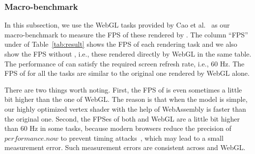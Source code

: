 


\subsubsection{Macro-benchmark}

In this subsection, we use the WebGL tasks provided by Cao et al.~\cite{ndss17cao} as our macro-benchmark to measure the FPS of these rendered by \sys.  The column ``FPS'' under \sys of Table~\ref{tab:result} shows the FPS of each rendering task and we also show the FPS without \sys, i.e., these rendered directly by WebGL in the same table.  The performance of \sys can satisfy the required screen refresh rate, i.e., 60 Hz. 
 The FPS of \sys for all the tasks are similar to the original one rendered by WebGL alone. 
 
 There are two things worth noting.  First, the FPS of \sys is even sometimes a little bit higher than the one of WebGL.  The reason is that when the model is simple, our highly optimized vertex shader with the help of WebAssembly is faster than the original one.  Second, the FPSes of both \sys and WebGL are a little bit higher than 60 Hz in some tasks, because modern browsers reduce the precision of $performance.now$ to prevent timing attacks~\cite{performancenowprecision}, which may lead to a small measurement error.  Such measurement errors are consistent across \sys and WebGL. 
 
 
